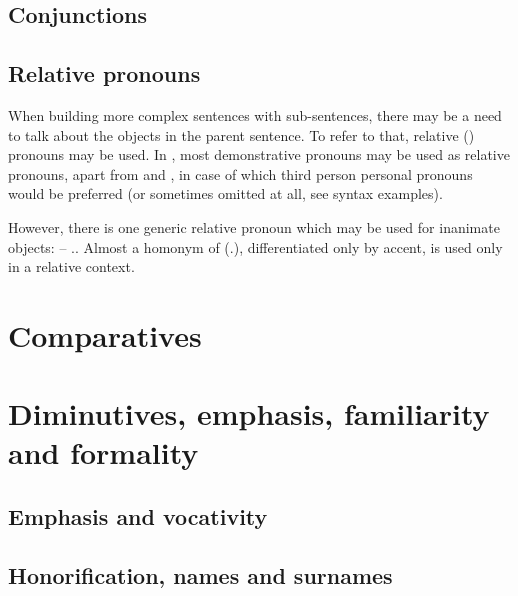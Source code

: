 \subsection{Conjunctions}


\subsection{Relative pronouns}
When building more complex sentences with sub-sentences, there may be a need to
talk about the objects in the parent sentence. To refer to that, relative
(\Rel{}) pronouns may be used. In \andro, most demonstrative pronouns may be
used as relative pronouns, apart from  and , in case of
which third person personal pronouns would be preferred (or sometimes omitted at
all, see syntax examples).

However, there is one generic relative pronoun which may be used for inanimate
objects:  -- \Rel{}.\Inan{}. Almost a homonym of 
(\Tpl{}.\Inan{}), differentiated only by accent,  is used only in a
relative context.

\section{Comparatives}
\label{sec:comparatives}


\section{Diminutives, emphasis, familiarity and formality}
\label{sec:diminutives}

\subsection{Emphasis and vocativity}



\subsection{Honorification, names and surnames}

